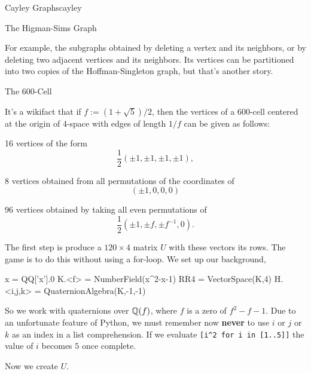 \begin{chap}{Cayley Graphs}{cayley}
\begin{sect}{The Higman-Sims Graph}
\begin{para}
For example, the subgraphs obtained by deleting a vertex and its neighbors,
or by deleting two adjacent vertices and its neighbors. Its vertices
can be partitioned into two copies of the Hoffman-Singleton graph,
but that's another story.
\end{para}
%
\end{sect}
%
\begin{sect}{The 600-Cell}
%
\begin{para}
It's a wikifact that if $f:=(1+\sqrt{5})/2$, then the vertices of a 600-cell 
centered at the origin of 4-space with edges of length $1/f$ 
can be given as follows: 
\begin{enumerate}
    \begin{listitem}
    16 vertices of the form
    \[
        \frac12(\pm1,\pm1,\pm1,\pm1),
    \]
    \end{listitem}
    \begin{listitem}
    8 vertices obtained from all permutations of the coordinates of
    \[
        (\pm1,0,0,0)
    \]
    \end{listitem}
    \begin{listitem}
    96 vertices obtained by taking all even permutations of
    \[
        \frac12\left(\pm1,\pm f,\pm f^{-1},0\right).
    \]
    \end{listitem}
\end{enumerate}  
\end{para}
%
\begin{para}
The first step is produce a $120\times4$ matrix $U$ with these vectors
its rows. The game is to do this without using a for-loop.
We set up our background,
\end{para}
%
\begin{sagecode}
\begin{sageinput}
x = QQ['x'].0
K.<f> = NumberField(x^2-x-1)
RR4 = VectorSpace(K,4) 
H.<i,j,k> = QuaternionAlgebra(K,-1,-1)
\end{sageinput}
\end{sagecode}
%
\begin{para}
So we work with quaternions over ${\mathbb Q}(f)$, where $f$ is a zero of $f^2-f-1$.
Due to an unfortunate feature of Python, we must remember now \textbf{never}
to use $i$ or $j$ or $k$ as an index in a list comprehension.  If we evaluate 
\verb|[i^2 for i in [1..5]]| the value of $i$ becomes $5$ once complete.
\end{para}
%
\begin{para}
Now we create $U$. 
\end{para}

\end{sect}
\end{chap}
